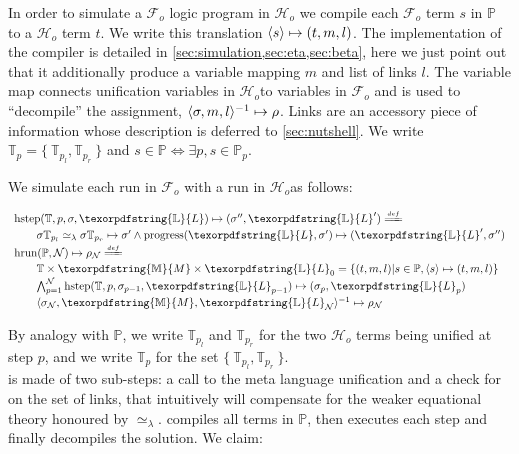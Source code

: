 \documentclass[sigconf,natbib=false,review]{acmart}
\newcommand{\UnifRel}{\ensuremath{\simeq}}
\newcommand{\Ue}{\ensuremath{\UnifRel_\lambda}\xspace}
\newcommand{\Fo}{\texorpdfstring{\ensuremath{\mathcal{F}_{\!o}\xspace}}{Fo}} %
\newcommand{\Ho}{\texorpdfstring{\ensuremath{\mathcal{H}_o}\xspace}{Ho}}
\newcommand{\linkStore}{\texorpdfstring{\ensuremath{\mathbb{L}}\xspace}{L}}
\newcommand{\mapStore}{\texorpdfstring{\ensuremath{\mathbb{M}}\xspace}{M}}
\newcommand{\foUnifPb}{\ensuremath{\mathbb{P}}\xspace}
\newcommand{\hoUnifPb}{\ensuremath{\mathbb{T}}\xspace}
\begin{document}
\noindent
{} 
In order to simulate a \Fo{} logic program in \Ho{} we compile
each \Fo{} term $s$ in \foUnifPb to a \Ho{} term $t$.
We write this translation $\langle s \rangle\mapsto(t,m,l)$. The implementation of the compiler
is detailed in \cref{sec:simulation,sec:eta,sec:beta}, here we just point
out that it additionally produce a variable mapping $m$ and list of links $l$.
The variable map connects unification variables in \Ho to variables
in \Fo{} and is used to ``decompile'' the assignment,
$\langle \sigma,m,l \rangle^{-1}\mapsto \rho$. Links are an accessory piece of information whose
description is deferred to \cref{sec:nutshell}.
We write $\hoUnifPb_p = \{~ \hoUnifPb_{p_l}, \hoUnifPb_{p_r} ~\}$
and $s \in \foUnifPb \Leftrightarrow \exists p, s \in \foUnifPb_p$.

We simulate each run in \Fo{} with a run in \Ho as follows:

$$
\begin{array}{l}
\stepH{\hoUnifPb}{p}{\sigma}{\linkStore}{\sigma''}{\linkStore'} \deff\vspace{2pt}\\
  \qquad\stepHD{\hoUnifPb}{p}{\sigma}{\sigma'}{\sigma''}{\linkStore}\vspace{2pt}\\
  \runH{\foUnifPb}{\mathcal{N}}{\rho} \deff \vspace{2pt}\\
  \qquad \hoUnifPb \times \mapStore \times \linkStore_0 = \{ (t,m,l) | s \in \foUnifPb, \C{s}{t}{m}{l} \}\vspace{2pt}\\
  \qquad \runHD{\hoUnifPb}{\mathcal{N}}{\linkStore}\vspace{2pt}\\
  \qquad \D{\sigma_{\mathcal{N}}}{\mapStore}{\linkStore_{\mathcal{N}}}{\rho_{\mathcal{N}}}
\end{array}
$$

\noindent
By analogy with \foUnifPb, we write $\hoUnifPb_{p_l}$ and $\hoUnifPb_{p_r}$
for the two \Ho{} terms being unified at step $p$, and we write $\hoUnifPb_p$
for the set $\{~ \hoUnifPb_{p_l}, \hoUnifPb_{p_r} ~\}$.\\
\hstep{} is made of two sub-steps: a call to the meta language
unification and a check for \progress{} on the set of links, that intuitively
will compensate for the weaker equational theory honoured by \Ue.
\hrun{} compiles all terms in \foUnifPb{}, then executes each step and
finally decompiles the solution.
We claim:
\end{document}
